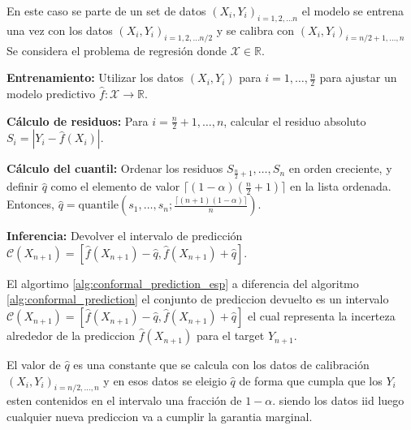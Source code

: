En este caso se parte de un set de datos $(X_i, Y_i)_{i=1,2, \dots n}$ el modelo se entrena una vez con los datos $(X_i, Y_i)_{i=1,2, \dots n/2}$ y se calibra con $(X_i,Y_i)_{i=n/2 + 1, \dots , n}$
Se considera el problema de regresión donde $\mathcal{X} \in \mathbb{R}$.



\begin{algorithm}[H]
\caption{SCP caso especial - regresión}
\label{alg:conformal_prediction_esp}
    \begin{algorithmic}[1] %
        \STATE \textbf{Entrenamiento:} Utilizar los datos $(X_i, Y_i)$ para $i = 1, \dots, \frac{n}{2}$ para ajustar un modelo predictivo $\hat{f} : \mathcal{X} \to \mathbb{R}$.

        \STATE \textbf{Cálculo de residuos:} Para $i = \frac{n}{2} + 1, \dots, n$, calcular el residuo absoluto $S_i = |Y_i - \hat{f}(X_i)|$.

        \STATE \textbf{Cálculo del cuantil:} Ordenar los residuos $S_{\frac{n}{2}+1}, \dots, S_n$ en orden creciente, y definir $\hat{q}$ como el elemento de valor $\lceil(1 - \alpha)(\frac{n}{2} + 1)\rceil$ en la lista ordenada.
        Entonces, $\hat{q} = \text{quantile}\left(s_1, \dots, s_n; \frac{\lceil(n+1)(1-\alpha)\rceil}{n}\right)$.

        \STATE \textbf{Inferencia:} Devolver el intervalo de predicción $\mathcal{C}(X_{n+1}) = [\hat{f}(X_{n+1}) - \hat{q}, \hat{f}(X_{n+1}) + \hat{q}]$.
    \end{algorithmic}
\end{algorithm}

El algortimo \ref{alg:conformal_prediction_esp} a diferencia del algoritmo \ref{alg:conformal_prediction} el conjunto de prediccion devuelto es un intervalo $\mathcal{C}(X_{n+1}) = [\hat{f}(X_{n+1}) - \hat{q}, \hat{f}(X_{n+1}) + \hat{q}]$ el cual representa la incerteza alrededor de la prediccion $\hat{f}(X_{n+1})$ para el target $Y_{n+1}$.

El valor de $\hat{q}$ es una constante que se calcula con los datos de calibración $(X_i,Y_i)_{i=n/2, \dots, n}$ y en esos datos se eleigio $\hat{q}$ de forma que cumpla que los $Y_i$ esten contenidos en el intervalo una fracción de $1-\alpha$. siendo los datos iid luego cualquier nueva prediccion va a cumplir la garantia marginal.


